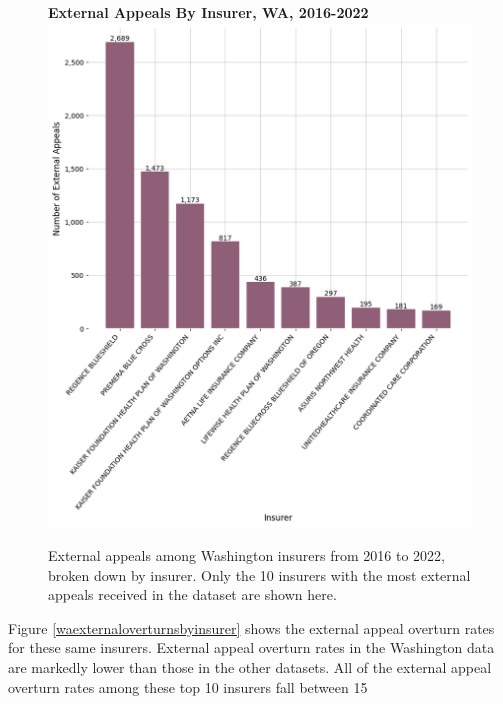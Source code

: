 \documentclass[12pt, a4paper,twoside]{report}
\theoremstyle{plain} %
\theoremstyle{definition} %
\theoremstyle{remark} %
\numberwithin{equation}{chapter}
\begin{document}
		
		\begin{figure}[h!]
			\centering
			\textbf{External Appeals By Insurer, WA, 2016-2022}
			\includegraphics[width=.8\textwidth]{images/wa_external_appeals/external_appeals_by_insurer.png}
			\caption{External appeals among Washington insurers from 2016 to 2022, broken down by insurer. Only the 10 insurers with the most external appeals received in the dataset are shown here.}
			\label{waexternalbyinsurer}
		\end{figure}
		
		Figure \ref{waexternaloverturnsbyinsurer} shows the external appeal overturn rates for these same insurers. External appeal overturn rates in the Washington data are markedly lower than those in the other datasets. All of the external appeal overturn rates among these top 10 insurers fall between 15%
		
\end{document}
